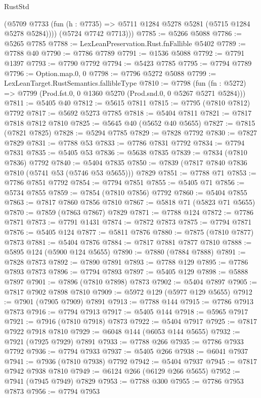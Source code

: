 \begin{lexlean}{RustStd}
\begin{coremodule}
          (@5709 @7733 (fun (h : @7735) => @5711 @1284 @5278 @5281 (@5715 @1284 @5278 @5284))))
        (@5724 @7742 @7713)))
@7785 := @5266 @5088
@7786 := @5265 @7785
@7788 := LexLeanPreservation.Rust.fnFallible @5402
@7789 := @7788 @40
@7790 := @7786 @7789
@7791 := @1536 @5088
@7792 := @7791 @1397
@7793 := @7790 @7792
@7794 := @5423 @7785
@7795 := @7794 @7789
@7796 := Option.map.{0, 0}
@7798 := @7796 @5272 @5088
@7799 := LexLeanTarget.RustSemantics.fallibleType
@7810 := @7798
    (fun (fn : @5272) => @7799 (Prod.fst.{0, 0} @1360 @5270 (Prod.snd.{0, 0} @5267 @5271 @5284)))
@7811 := @5405 @40
@7812 := @5615 @7811
@7815 := @7795 (@7810 @7812) @7792
@7817 := @5692 @5273 @7785
@7818 := @5404 @7811
@7821 := @7817 @7818 @7812 @7810
@7825 := @5645 @40 (@5652 @40 @5655)
@7827 := @7815 (@7821 @7825)
@7828 := @5294 @7785
@7829 := @7828 @7792
@7830 := @7827 @7829
@7831 := @7788 @53
@7833 := @7786 @7831 @7792
@7834 := @7794 @7831
@7835 := @5405 @53
@7836 := @5638 @7835
@7839 := @7834 (@7810 @7836) @7792
@7840 := @5404 @7835
@7850 := @7839 (@7817 @7840 @7836 @7810 (@5741 @53 (@5746 @53 @5655))) @7829
@7851 := @7788 @71
@7853 := @7786 @7851 @7792
@7854 := @7794 @7851
@7855 := @5405 @71
@7856 := @5734 @7855
@7859 := @7854 (@7810 @7856) @7792
@7860 := @5404 @7855
@7863 := @7817 @7860 @7856 @7810
@7867 := @5818 @71 (@5823 @71 @5655)
@7870 := @7859 (@7863 @7867) @7829
@7871 := @7788 @124
@7872 := @7786 @7871
@7873 := @7791 @1431
@7874 := @7872 @7873
@7875 := @7794 @7871
@7876 := @5405 @124
@7877 := @5811 @7876
@7880 := @7875 (@7810 @7877) @7873
@7881 := @5404 @7876
@7884 := @7817 @7881 @7877 @7810
@7888 := @5895 @124 (@5900 @124 @5655)
@7890 := @7880 (@7884 @7888)
@7891 := @7828 @7873
@7892 := @7890 @7891
@7893 := @7788 @129
@7895 := @7786 @7893 @7873
@7896 := @7794 @7893
@7897 := @5405 @129
@7898 := @5888 @7897
@7901 := @7896 (@7810 @7898) @7873
@7902 := @5404 @7897
@7905 := @7817 @7902 @7898 @7810
@7909 := @5972 @129 (@5977 @129 @5655)
@7912 := @7901 (@7905 @7909) @7891
@7913 := @7788 @144
@7915 := @7786 @7913 @7873
@7916 := @7794 @7913
@7917 := @5405 @144
@7918 := @5965 @7917
@7921 := @7916 (@7810 @7918) @7873
@7922 := @5404 @7917
@7925 := @7817 @7922 @7918 @7810
@7929 := @6048 @144 (@6053 @144 @5655)
@7932 := @7921 (@7925 @7929) @7891
@7933 := @7788 @266
@7935 := @7786 @7933 @7792
@7936 := @7794 @7933
@7937 := @5405 @266
@7938 := @6041 @7937
@7941 := @7936 (@7810 @7938) @7792
@7942 := @5404 @7937
@7945 := @7817 @7942 @7938 @7810
@7949 := @6124 @266 (@6129 @266 @5655)
@7952 := @7941 (@7945 @7949) @7829
@7953 := @7788 @300
@7955 := @7786 @7953 @7873
@7956 := @7794 @7953

\end{coremodule}
\end{lexlean}
